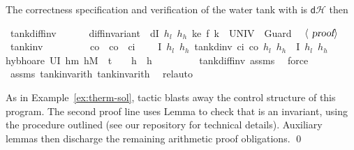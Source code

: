 \documentclass[envcountsame,envcountsect]{llncs}
\newcommand{\dH}{\mathsf{d}\mathcal{H}}
\begin{document}
\begin{example}
\noindent The correctness specification and verification of the water
tank with is $\dH$ then

\begin{isabellebody}
\isanewline
{}\isamarkupfalse%
\ tank{\isacharunderscore}diff{\isacharunderscore}inv{\isacharcolon}\isanewline
\ \ {\isachardoublequoteopen}{}\ {\isasymle}\ {\isasymtau}\ {\isasymLongrightarrow}\ diff{\isacharunderscore}invariant\ \ {\isasymlbrakk}dI\ $h_l$\ $h_h$\ k{\isasymrbrakk}\isactrlsub e\ {\isacharparenleft}f\ k{\isacharparenright}\ {\isacharbraceleft}{}{\isachardot}{\isachardot}{\isasymtau}{\isacharbraceright}\ UNIV\ {}\ Guard{\isachardoublequoteclose}\isanewline
\ \ $\langle \isa{proof}\rangle$\isanewline
\isanewline
{}\isamarkupfalse%
\ tank{\isacharunderscore}inv{\isacharcolon}\isanewline
\ \ \ {\isachardoublequoteopen}{}\ {\isasymle}\ {\isasymtau}{\isachardoublequoteclose}\ \ {\isachardoublequoteopen}{}\ {\isacharless}\ c\isactrlsub o{\isachardoublequoteclose}\ \ {\isachardoublequoteopen}c\isactrlsub o\ {\isacharless}\ c\isactrlsub i{\isachardoublequoteclose}\isanewline
\ \ \ {\isachardoublequoteopen}\ \isactrlbold {\isacharbraceleft}I\ $h_l$\ $h_h$\isactrlbold {\isacharbraceright}\ tank{\isacharunderscore}dinv\ c\isactrlsub i\ c\isactrlsub o\ $h_l$\ $h_h$\ {\isasymtau}\ \isactrlbold {\isacharbraceleft}I\ $h_l$\ $h_h$\isactrlbold {\isacharbraceright}{\isachardoublequoteclose}\isanewline
\ \ \isamarkupfalse%
{\isacharparenleft}hyb{\isacharunderscore}hoare\ {\isachardoublequoteopen}U{\isacharparenleft}I\ h\isactrlsub m\ h\isactrlsub M\ {\isasymand}\ t\ {\isacharequal}\ {}\ {\isasymand}\ h\ {\isacharequal}\ h{\isacharparenright}{\isachardoublequoteclose}{\isacharparenright}\isanewline
\ \ \isamarkupfalse%
\ {}\ \isamarkupfalse%
\ {}\ \isamarkupfalse%
\ tank{\isacharunderscore}diff{\isacharunderscore}inv\ assms\ \isamarkupfalse%
\ force{\isacharplus}\isanewline
\ \ \isamarkupfalse%
\ assms\ tank{\isacharunderscore}inv{\isacharunderscore}arith{}\ tank{\isacharunderscore}inv{\isacharunderscore}arith{}\ \isamarkupfalse%
\ rel{\isacharunderscore}auto{\isacharprime}\isanewline
\end{isabellebody}

\noindent As in Example~\ref{ex:therm-sol}, tactic 
blasts away the control structure of this program. The second proof
line uses Lemma  to check that  is an
invariant, using the procedure outlined (see our repository for
technical details). Auxiliary lemmas then discharge the remaining
arithmetic proof obligations.  \qed
\end{example}
\end{document}
